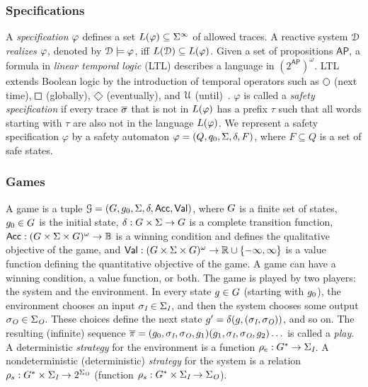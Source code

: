 \subsubsection*{Specifications}

A \emph{specification} $\varphi$ defines a set $L(\varphi) \subseteq \Sigma^\infty$ of allowed traces.
%
A reactive system $\mathcal{D}$ \emph{realizes} $\varphi$, denoted by $\mathcal{D} \models \varphi$, iff
$L(\mathcal{D}) \subseteq L(\varphi)$.
Given a set of propositions $\mathsf{AP}$, a formula in \emph{linear temporal logic} (LTL) describes a language in $(2^\mathsf{AP})^\omega$. LTL extends Boolean logic by the introduction of temporal operators such as $\LTLnext$ (next time), $\LTLglobally$ (globally), $\LTLfinally$ (eventually), and $\operatorname{\mathcal{U}}$ (until)~\cite{Pnueli77}.
%
$\varphi$ is called a \emph{safety specification} if every trace $\overline\sigma$ that is not in  $L(\varphi)$  has a prefix $\tau$ such that all words starting with $\tau$ are also not in the language $L(\varphi)$.
We represent a safety specification $\varphi$ by a safety automaton
$\varphi = (Q, q_0, \Sigma, \delta, F)$, where $F\subseteq Q$ is a set of safe states.

\subsubsection*{Games}
%
A game is a tuple $\mathcal{G} = (G,
g_0, \Sigma, \delta, \mathsf{Acc}, \mathsf{Val})$,
where $G$ is a finite set of states, $g_0 \in G$ is the initial state,
$\delta: G \times \Sigma \rightarrow G$
is a complete transition function, $\mathsf{Acc}: (G \times \Sigma \times G)^\omega \rightarrow \mathbb{B}$ is a winning condition
and defines the qualitative objective of the game, and $\mathsf{Val}: (G \times \Sigma \times G)^\omega \rightarrow \mathbb{R} \cup \{-\infty, \infty \}$ is a value function defining the quantitative objective of the game. A game can have a winning condition, a value function, or both.
%
The game is played  by two players:  the system and the environment. In every state $g\in G$
(starting with $g_0$), the environment chooses an input
$\sigma_{\textit{I}} \in \Sigma_{\textit{I}}$, and then the system chooses some output $\sigma_{\textit{O}} \in \Sigma_{\textit{O}}$. These choices define the next state $g' = \delta(g,(\sigma_{\textit{I}}, \sigma_{\textit{O}}))$, and so on. The resulting (infinite)
sequence $\overline{\pi} = (g_0,\sigma_{\textit{I}}, \sigma_{\textit{O}}, g_1) (g_1,\sigma_{\textit{I}}, \sigma_{\textit{O}}, g_2) \ldots$ is called a \emph{play}.
A deterministic  \emph{strategy} for the environment is a function
$\rho_e: G^* \rightarrow \Sigma_{\textit{I}}$.
A nondeterministic (deterministic) \emph{strategy} for the system is a relation $\rho_s:
G^* \times \Sigma_{\textit{I}} \rightarrow 2^{\Sigma_{\textit{O}}}$  (function $\rho_s:
G^* \times \Sigma_{\textit{I}} \rightarrow \Sigma_{\textit{O}}$).

